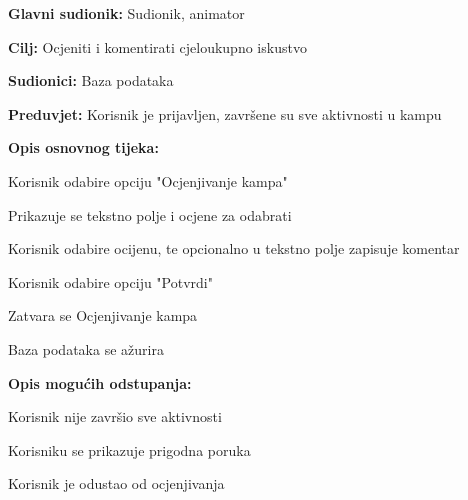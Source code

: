 					\noindent {}
					\begin{packed_item}
						
						\item \textbf{Glavni sudionik: } Sudionik, animator
						\item  \textbf{Cilj:} Ocjeniti i komentirati cjeloukupno iskustvo
						\item  \textbf{Sudionici:} Baza podataka
						\item  \textbf{Preduvjet:} Korisnik je prijavljen, završene su sve aktivnosti u kampu
						\item  \textbf{Opis osnovnog tijeka:}
						
						\item[] \begin{packed_enum}
							
							\item Korisnik odabire opciju "Ocjenjivanje kampa"
							\item Prikazuje se tekstno polje i ocjene za odabrati
							\item Korisnik odabire ocijenu, te opcionalno u tekstno polje zapisuje komentar
							\item Korisnik odabire opciju "Potvrdi"
							\item Zatvara se Ocjenjivanje kampa
							\item Baza podataka se ažurira
						\end{packed_enum}
						
						\item  \textbf{Opis mogućih odstupanja:}
						
						\item[] \begin{packed_item}
							
							\item[1.a] Korisnik nije završio sve aktivnosti
							\item[] \begin{packed_enum}
								
								\item Korisniku se prikazuje prigodna poruka
								
							\end{packed_enum}
							\item[3.a] Korisnik je odustao od ocjenjivanja
							\item[] \begin{packed_enum}
								

\end{packed_enum}
\end{packed_item}
\end{packed_item}
